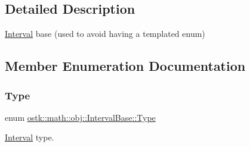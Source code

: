 \subsection{Detailed Description}
\hyperlink{classostk_1_1math_1_1obj_1_1_interval}{Interval} base (used to avoid having a templated enum) 

\subsection{Member Enumeration Documentation}
\mbox{\label{classostk_1_1math_1_1obj_1_1_interval_base_a0dd9bd29a9bfefa26de9b88ac81de92a}} 
\subsubsection{\texorpdfstring{Type}{Type}}
{\footnotesize\ttfamily enum \hyperlink{classostk_1_1math_1_1obj_1_1_interval_base_a0dd9bd29a9bfefa26de9b88ac81de92a}{ostk\+::math\+::obj\+::\+Interval\+Base\+::\+Type}\hspace{0.3cm}{\ttfamily [strong]}}



\hyperlink{classostk_1_1math_1_1obj_1_1_interval}{Interval} type. 

